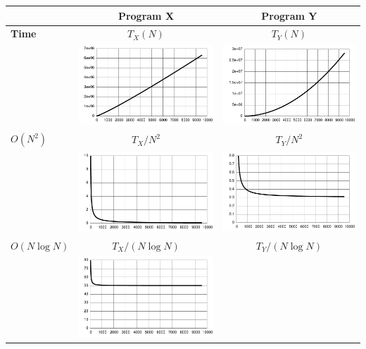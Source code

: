 \documentclass[a4paper]{article}
\begin{document}
\begin{center}
  \begin{tabular}{|l|c|c|}
    \hline
    &
    \textbf{Program X} &
    \textbf{Program Y} \\
    \hline
    \textbf{Time} &
    $T_X(N)$ &
    $T_Y(N)$ \\
    &
    \includegraphics[width=0.44\columnwidth]{onln.pdf} &
    \includegraphics[width=0.44\columnwidth]{on2.pdf} \\
    \hline
    $O(N^2)$ &
    $T_X/N^2$ &
    $T_Y/N^2$ \\
    &
    \includegraphics[width=0.44\columnwidth]{onln_n2.pdf} &
    \includegraphics[width=0.44\columnwidth]{on2_n2.pdf} \\
    \hline
    $O(N\log N)$ &
    $T_X/(N\log N)$ &
    $T_Y/(N\log N)$ \\
    &
    \includegraphics[width=0.44\columnwidth]{onln_nln.pdf} &

\end{tabular}
\end{center}
\end{document}
